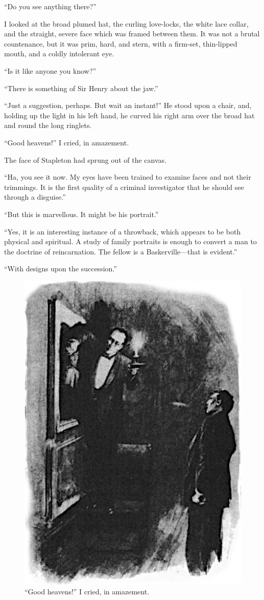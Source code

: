 \documentclass[paper=5.5in:8.5in,BCOR=7mm,twoside,DIV=calc,12pt,usegeometry,openany,chapterprefix,endperiod]{scrbook} %
\begin{document}
\enquote{Do you see anything there?}

I looked at the broad plumed hat, the curling love-locks, the white lace collar, and the straight, severe face which was framed between them. It was not a brutal countenance, but it was prim, hard, and stern, with a firm-set, thin-lipped mouth, and a coldly intolerant eye.

\enquote{Is it like anyone you know?}

\enquote{There is something of Sir Henry about the jaw.}

\enquote{Just a suggestion, perhaps. But wait an instant!} He stood upon a chair, and, holding up the light in his left hand, he curved his right arm over the broad hat and round the long ringlets.

\enquote{Good heavens!} I cried, in amazement.

The face of Stapleton had sprung out of the canvas.

\enquote{Ha, you see it now. My eyes have been trained to examine faces and not their trimmings. It is the first quality of a criminal investigator that he should see through a disguise.}

\enquote{But this is marvellous. It might be his portrait.}

\enquote{Yes, it is an interesting instance of a throwback, which appears to be both physical and spiritual. A study of family portraits is enough to convert a man to the doctrine of reincarnation. The fellow is a Baskerville\nobreakdash---that is evident.}

\enquote{With designs upon the succession.}

\begin{figure}[tbh]
\centering
\includegraphics[width=.6\linewidth]{13_mirror}
\caption{\enquote{Good heavens!} I cried, in amazement.}
\end{figure}
\end{document}
